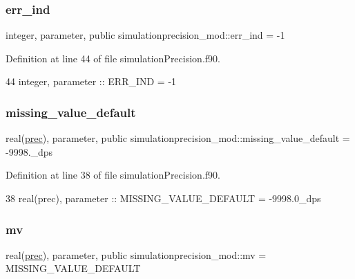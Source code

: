 \subsubsection{\texorpdfstring{err\+\_\+ind}{err\_ind}}
{\footnotesize\ttfamily integer, parameter, public simulationprecision\+\_\+mod\+::err\+\_\+ind = -\/1}



Definition at line 44 of file simulation\+Precision.\+f90.


\begin{DoxyCode}
44     \textcolor{keywordtype}{integer},  \textcolor{keywordtype}{parameter}   :: ERR\_IND  = -1
\end{DoxyCode}
\mbox{\label{namespacesimulationprecision__mod_a8fe62365170cdfed5a745be6d8e99e1c}} 
\subsubsection{\texorpdfstring{missing\+\_\+value\+\_\+default}{missing\_value\_default}}
{\footnotesize\ttfamily real(\mbox{\hyperlink{namespacesimulationprecision__mod_a361ca48174e0dc2228c07f25fa5396ec}{prec}}), parameter, public simulationprecision\+\_\+mod\+::missing\+\_\+value\+\_\+default = -\/9998.\+\_\+dps}



Definition at line 38 of file simulation\+Precision.\+f90.


\begin{DoxyCode}
38     \textcolor{keywordtype}{real(prec)}, \textcolor{keywordtype}{parameter} :: MISSING\_VALUE\_DEFAULT = -9998.0\_dps
\end{DoxyCode}
\mbox{\label{namespacesimulationprecision__mod_aee970e36f3dc8fb77c175ead993257d9}} 
\subsubsection{\texorpdfstring{mv}{mv}}
{\footnotesize\ttfamily real(\mbox{\hyperlink{namespacesimulationprecision__mod_a361ca48174e0dc2228c07f25fa5396ec}{prec}}), parameter, public simulationprecision\+\_\+mod\+::mv = M\+I\+S\+S\+I\+N\+G\+\_\+\+V\+A\+L\+U\+E\+\_\+\+D\+E\+F\+A\+U\+LT}




